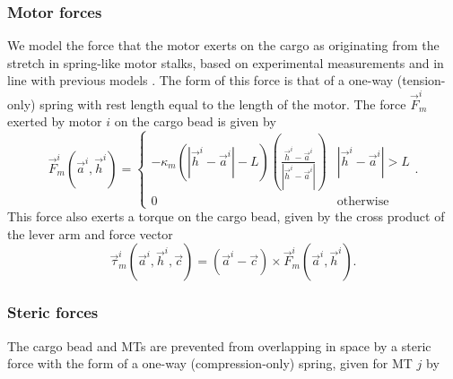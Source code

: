 \subsubsection*{Motor forces}

We model the force that the motor exerts on the cargo as originating from the stretch in spring-like motor stalks, based on experimental measurements \cite{Kojima1997,Jeney2004} and in line with  previous models \cite{Erickson2011,Korn2009,Kunwar2008}. The form of this force is that of a one-way (tension-only) spring with rest length equal to the length of the motor. The force $\vec{F}_m^i$ exerted by motor $i$ on the cargo bead is given by
\begin{equation} \label{eq:motor_spring}
\vec{F}_m^i \left( \vec{a}^i,\vec{h}^i \right) = 
\begin{cases}
	- \kappa_m \left( \left| \vec{h}^i - \vec{a}^i \right| - L \right) \left( \frac{\vec{h}^i - \vec{a}^i}{\left| 		\vec{h}^i - \vec{a}^i \right|} \right) & \left| \vec{h}^i - \vec{a}^i \right| >  L\\
	0 & \text{otherwise}
\end{cases}.
\end{equation}
This force also exerts a torque on the cargo bead, given by the cross product of the lever arm and force vector
\begin{equation} \label{eq:motor_torque}
\vec{\tau}_m^i \left( \vec{a}^i,\vec{h}^i,\vec{c} \right)= 
\left( \vec{a}^i - \vec{c} \right) \times \vec{F}_m^i \left( \vec{a}^i,\vec{h}^i \right).
\end{equation}

\subsubsection*{Steric forces}


The cargo bead and MTs are prevented from overlapping in space by a steric force with the form of a one-way (compression-only) spring, given for MT $j$ by 

